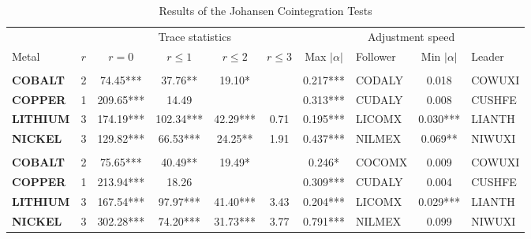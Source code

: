 \begin{table}[!h]
\centering
\caption{\label{tab:johansen}Results of the Johansen Cointegration Tests}
\centering
\fontsize{10}{12}\selectfont
\begin{tabular}[t]{>{}lcccccclcl}
\toprule
\multicolumn{2}{c}{ } & \multicolumn{4}{c}{Trace statistics} & \multicolumn{4}{c}{Adjustment speed} \\
\cmidrule(l{3pt}r{3pt}){3-6} \cmidrule(l{3pt}r{3pt}){7-10}
Metal & $r$ & $r=0$ & $r \leq 1$ & $r \leq 2$ & $r \leq 3$ & Max $|\alpha|$ & Follower & Min $|\alpha|$ & Leader\\
\midrule
\addlinespace[0.3em]
\multicolumn{10}{l}{\textbf{Raw series}}\\
\textbf{COBALT} & 2 & 74.45*** & 37.76** & 19.10* &  & 0.217*** & CODALY & 0.018 & COWUXI\\
\textbf{COPPER} & 1 & 209.65*** & 14.49 &  &  & 0.313*** & CUDALY & 0.008 & CUSHFE\\
\textbf{LITHIUM} & 3 & 174.19*** & 102.34*** & 42.29*** & 0.71 & 0.195*** & LICOMX & 0.030*** & LIANTH\\
\textbf{NICKEL} & 3 & 129.82*** & 66.53*** & 24.25** & 1.91 & 0.437*** & NILMEX & 0.069** & NIWUXI\\
\addlinespace[0.3em]
\multicolumn{10}{l}{\textbf{Filtered}}\\
\textbf{COBALT} & 2 & 75.65*** & 40.49** & 19.49* &  & 0.246* & COCOMX & 0.009 & COWUXI\\
\textbf{COPPER} & 1 & 213.94*** & 18.26 &  &  & 0.309*** & CUDALY & 0.004 & CUSHFE\\
\textbf{LITHIUM} & 3 & 167.54*** & 97.97*** & 41.40*** & 3.43 & 0.204*** & LICOMX & 0.029*** & LIANTH\\
\textbf{NICKEL} & 3 & 302.28*** & 74.20*** & 31.73*** & 3.77 & 0.791*** & NILMEX & 0.099 & NIWUXI\\
\bottomrule
\end{tabular}
\end{table}
